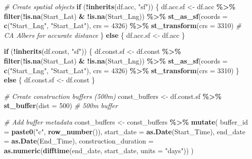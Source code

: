 \documentclass[
]{article}
\newenvironment{Shaded}{\begin{snugshade}}{\end{snugshade}}
\newcommand{\AttributeTok}[1]{\textcolor[rgb]{0.13,0.29,0.53}{#1}}
\newcommand{\CommentTok}[1]{\textcolor[rgb]{0.56,0.35,0.01}{\textit{#1}}}
\newcommand{\ControlFlowTok}[1]{\textcolor[rgb]{0.13,0.29,0.53}{\textbf{#1}}}
\newcommand{\DecValTok}[1]{\textcolor[rgb]{0.00,0.00,0.81}{#1}}
\newcommand{\FunctionTok}[1]{\textcolor[rgb]{0.13,0.29,0.53}{\textbf{#1}}}
\newcommand{\NormalTok}[1]{#1}
\newcommand{\OtherTok}[1]{\textcolor[rgb]{0.56,0.35,0.01}{#1}}
\newcommand{\SpecialCharTok}[1]{\textcolor[rgb]{0.81,0.36,0.00}{\textbf{#1}}}
\newcommand{\StringTok}[1]{\textcolor[rgb]{0.31,0.60,0.02}{#1}}
\begin{document}
\begin{Shaded}
\begin{Highlighting}[]
\CommentTok{\# Create spatial objects}
\ControlFlowTok{if}\NormalTok{ (}\SpecialCharTok{!}\FunctionTok{inherits}\NormalTok{(df.acc, }\StringTok{"sf"}\NormalTok{)) \{}
\NormalTok{  df.acc.sf }\OtherTok{\textless{}{-}}\NormalTok{ df.acc }\SpecialCharTok{\%\textgreater{}\%}
    \FunctionTok{filter}\NormalTok{(}\SpecialCharTok{!}\FunctionTok{is.na}\NormalTok{(Start\_Lat) }\SpecialCharTok{\&} \SpecialCharTok{!}\FunctionTok{is.na}\NormalTok{(Start\_Lng)) }\SpecialCharTok{\%\textgreater{}\%}
    \FunctionTok{st\_as\_sf}\NormalTok{(}\AttributeTok{coords =} \FunctionTok{c}\NormalTok{(}\StringTok{"Start\_Lng"}\NormalTok{, }\StringTok{"Start\_Lat"}\NormalTok{), }\AttributeTok{crs =} \DecValTok{4326}\NormalTok{) }\SpecialCharTok{\%\textgreater{}\%}
    \FunctionTok{st\_transform}\NormalTok{(}\AttributeTok{crs =} \DecValTok{3310}\NormalTok{)  }\CommentTok{\# CA Albers for accurate distance}
\NormalTok{\} }\ControlFlowTok{else}\NormalTok{ \{}
\NormalTok{  df.acc.sf }\OtherTok{\textless{}{-}}\NormalTok{ df.acc}
\NormalTok{\}}

\ControlFlowTok{if}\NormalTok{ (}\SpecialCharTok{!}\FunctionTok{inherits}\NormalTok{(df.const, }\StringTok{"sf"}\NormalTok{)) \{}
\NormalTok{  df.const.sf }\OtherTok{\textless{}{-}}\NormalTok{ df.const }\SpecialCharTok{\%\textgreater{}\%}
    \FunctionTok{filter}\NormalTok{(}\SpecialCharTok{!}\FunctionTok{is.na}\NormalTok{(Start\_Lat) }\SpecialCharTok{\&} \SpecialCharTok{!}\FunctionTok{is.na}\NormalTok{(Start\_Lng)) }\SpecialCharTok{\%\textgreater{}\%}
    \FunctionTok{st\_as\_sf}\NormalTok{(}\AttributeTok{coords =} \FunctionTok{c}\NormalTok{(}\StringTok{"Start\_Lng"}\NormalTok{, }\StringTok{"Start\_Lat"}\NormalTok{), }\AttributeTok{crs =} \DecValTok{4326}\NormalTok{) }\SpecialCharTok{\%\textgreater{}\%}
    \FunctionTok{st\_transform}\NormalTok{(}\AttributeTok{crs =} \DecValTok{3310}\NormalTok{)}
\NormalTok{\} }\ControlFlowTok{else}\NormalTok{ \{}
\NormalTok{  df.const.sf }\OtherTok{\textless{}{-}}\NormalTok{ df.const}
\NormalTok{\}}

\CommentTok{\# Create construction buffers (500m)}
\NormalTok{const\_buffers }\OtherTok{\textless{}{-}}\NormalTok{ df.const.sf }\SpecialCharTok{\%\textgreater{}\%}
  \FunctionTok{st\_buffer}\NormalTok{(}\AttributeTok{dist =} \DecValTok{500}\NormalTok{)  }\CommentTok{\# 500m buffer}

\CommentTok{\# Add buffer metadata}
\NormalTok{const\_buffers }\OtherTok{\textless{}{-}}\NormalTok{ const\_buffers }\SpecialCharTok{\%\textgreater{}\%}
  \FunctionTok{mutate}\NormalTok{(}
    \AttributeTok{buffer\_id =} \FunctionTok{paste0}\NormalTok{(}\StringTok{"c"}\NormalTok{, }\FunctionTok{row\_number}\NormalTok{()),}
    \AttributeTok{start\_date =} \FunctionTok{as.Date}\NormalTok{(Start\_Time),}
    \AttributeTok{end\_date =} \FunctionTok{as.Date}\NormalTok{(End\_Time),}
    \AttributeTok{construction\_duration =} \FunctionTok{as.numeric}\NormalTok{(}\FunctionTok{difftime}\NormalTok{(end\_date, start\_date, }\AttributeTok{units =} \StringTok{"days"}\NormalTok{))}
\NormalTok{  )}
\end{Highlighting}
\end{Shaded}
\end{document}
